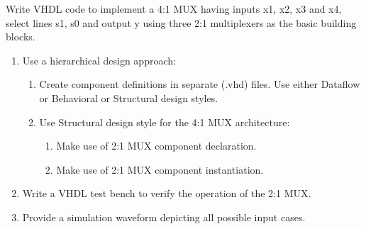 \documentclass{article}
\begin{document}
\begin{Q}
    {
        Write VHDL code to implement a 4:1 MUX having inputs x1, x2, x3 and x4, select lines s1,
        s0 and output y using three 2:1 multiplexers as the basic building blocks.
        \begin{enumerate}
            \item   Use a hierarchical design approach:
                  \begin{enumerate}
                      \item Create component definitions in separate (.vhd) files. Use either Dataflow or Behavioral or Structural
                            design styles.
                      \item Use Structural design style for the 4:1 MUX architecture:
                            \begin{enumerate}
                                \item Make use of 2:1 MUX component declaration.
                                \item Make use of 2:1 MUX component instantiation.
                            \end{enumerate}
                  \end{enumerate}
            \item  Write a VHDL test bench to verify the operation of the  2:1 MUX.
            \item Provide a simulation waveform depicting all possible input cases.
        \end{enumerate}
    }
\end{Q}

\end{document}
